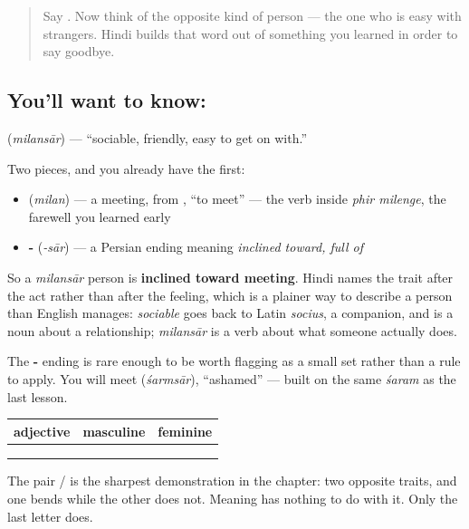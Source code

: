 \begin{quote}
Say \textbf{}. Now think of the opposite kind of person — the one who is easy with strangers. Hindi builds that word out of something you learned in order to say goodbye.
\end{quote}

\subsection*{You'll want to know: }
\textbf{} (\emph{milansār}) — \textquotedblleft{}sociable, friendly, easy to get on with.\textquotedblright{}

\begin{cousinweb}
Two pieces, and you already have the first:

\begin{itemize}
\raggedright
  \item \textbf{} (\emph{milan}) — a meeting, from \textbf{}, \textquotedblleft{}to meet\textquotedblright{} — the verb inside \emph{phir milenge}, the farewell you learned early
  \item \textbf{-} (\emph{-sār}) — a Persian ending meaning \emph{inclined toward, full of}
\end{itemize}

So a \emph{milansār} person is \textbf{inclined toward meeting}. Hindi names the trait after the act rather than after the feeling, which is a plainer way to describe a person than English manages: \emph{sociable} goes back to Latin \emph{socius}, a companion, and is a noun about a relationship; \emph{milansār} is a verb about what someone actually does.

The \textbf{-} ending is rare enough to be worth flagging as a small set rather than a rule to apply. You will meet \textbf{} (\emph{śarmsār}), \textquotedblleft{}ashamed\textquotedblright{} — built on the same \emph{śaram} as the last lesson.
\end{cousinweb}

\begin{grammarlens}[title={Grammar Lens: a consonant ending, so it stands still}]
\noindent
\begin{tabularx}{\linewidth}{@{}>{\raggedright\arraybackslash}X>{\raggedright\arraybackslash}X>{\raggedright\arraybackslash}X@{}}
\toprule
\textbf{adjective} & \textbf{masculine} & \textbf{feminine} \\
\midrule
\hi{शर्मीला} & \hi{शर्मीला} & \hi{शर्मीली} \\
\hi{होशियार} & \hi{होशियार} & \hi{होशियार} \\
\hi{मिलनसार} & \hi{मिलनसार} & \hi{मिलनसार} \\
\bottomrule
\end{tabularx}

The pair \textbf{} / \textbf{} is the sharpest demonstration in the chapter: two opposite traits, and one bends while the other does not. Meaning has nothing to do with it. Only the last letter does.
\end{grammarlens}

